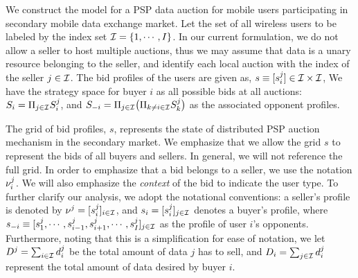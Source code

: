 We construct the model for a PSP data auction for mobile users
participating in secondary mobile data exchange market.
Let the set of all wireless users to be labeled by
the index set $\mathcal{I} = \lbrace 1, \cdots, I\rbrace$. In our current formulation, we do not allow a seller to host multiple
auctions, thus we may assume that data is a unary resource belonging to the seller, and
identify each local auction with the index of the seller
$j\in\mathcal{I}$. The bid profiles of the users are given as,
$s \equiv
[s_i^j] \in \mathcal{I} \times \mathcal{I}$,  
We have the strategy space for buyer $i$ as all possible bids at all auctions:
$S_i=\Pi_{j\in\mathcal{I}} S_i^j$, and $S_{-i} =\Pi_{j\in\mathcal{I}} \big( \Pi_{k\ne
i\in\mathcal{I}} S_k^j\big)$ as the
associated opponent profiles. 

The grid of bid profiles, $s$, represents the state of distributed PSP auction
mechanism in the secondary market. 
We emphasize that we allow the grid $s$ to represent the bids of all buyers and
sellers. In general, we will not reference the full grid. In order to emphasize
that a bid belongs to a seller, we use the notation $\nu_i^j$. We
will also emphasize the \emph{context} of the bid to indicate the user type.
To further clarify our analysis, we adopt the notational conventions: a
seller's profile is denoted by $\nu^j = [s_i^j]_{i\in\mathcal{I}}$, and $s_i =
[s_i^j]_{j\in\mathcal{I}}$ denotes a buyer's profile, where $s_{-i} \equiv [s_1^j , \cdots , s_{i-1}^j , s_{i+1}^j , \cdots
, s_I^j]_{j\in\mathcal{I}}$ as the profile of user $i$'s opponents.
Furthermore, noting that this is a simplification for ease of notation, we let
$D^j = \sum_{i\in\mathcal{I}} d_i^j$ be the total amount of data $j$ has to sell, and
$D_i = \sum_{j\in\mathcal{I}} d_i^j$ represent the total amount of data desired by buyer $i$. 

